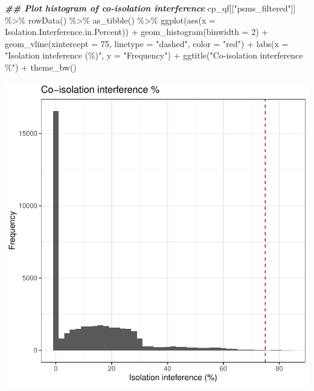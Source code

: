\documentclass[9pt,a4paper,]{extarticle}
\newenvironment{Shaded}{\begin{snugshade}}{\end{snugshade}}
\newcommand{\AttributeTok}[1]{\textcolor[rgb]{0.77,0.63,0.00}{#1}}
\newcommand{\DecValTok}[1]{\textcolor[rgb]{0.00,0.00,0.81}{#1}}
\newcommand{\DocumentationTok}[1]{\textcolor[rgb]{0.56,0.35,0.01}{\textbf{\textit{#1}}}}
\newcommand{\FunctionTok}[1]{\textcolor[rgb]{0.00,0.00,0.00}{#1}}
\newcommand{\NormalTok}[1]{#1}
\newcommand{\SpecialCharTok}[1]{\textcolor[rgb]{0.00,0.00,0.00}{#1}}
\newcommand{\StringTok}[1]{\textcolor[rgb]{0.31,0.60,0.02}{#1}}
\begin{document}
\begin{Shaded}
\begin{Highlighting}[]
\DocumentationTok{\#\# Plot histogram of co{-}isolation interference}
\NormalTok{cp\_qf[[}\StringTok{"psms\_filtered"}\NormalTok{]] }\SpecialCharTok{\%\textgreater{}\%}
  \FunctionTok{rowData}\NormalTok{() }\SpecialCharTok{\%\textgreater{}\%}
  \FunctionTok{as\_tibble}\NormalTok{() }\SpecialCharTok{\%\textgreater{}\%}
  \FunctionTok{ggplot}\NormalTok{(}\FunctionTok{aes}\NormalTok{(}\AttributeTok{x =}\NormalTok{ Isolation.Interference.in.Percent)) }\SpecialCharTok{+}
  \FunctionTok{geom\_histogram}\NormalTok{(}\AttributeTok{binwidth =} \DecValTok{2}\NormalTok{) }\SpecialCharTok{+}
  \FunctionTok{geom\_vline}\NormalTok{(}\AttributeTok{xintercept =} \DecValTok{75}\NormalTok{, }\AttributeTok{linetype =} \StringTok{"dashed"}\NormalTok{, }\AttributeTok{color =} \StringTok{"red"}\NormalTok{) }\SpecialCharTok{+}
  \FunctionTok{labs}\NormalTok{(}\AttributeTok{x =} \StringTok{"Isolation inteference (\%)"}\NormalTok{, }\AttributeTok{y =} \StringTok{"Frequency"}\NormalTok{) }\SpecialCharTok{+}
  \FunctionTok{ggtitle}\NormalTok{(}\StringTok{"Co{-}isolation interference \%"}\NormalTok{) }\SpecialCharTok{+}
  \FunctionTok{theme\_bw}\NormalTok{()}
\end{Highlighting}
\end{Shaded}

\begin{center}\includegraphics[height=0.3\textheight]{workflow_expressions_files/figure-latex/tmt_coisolation_2-1} \end{center}
\end{document}
